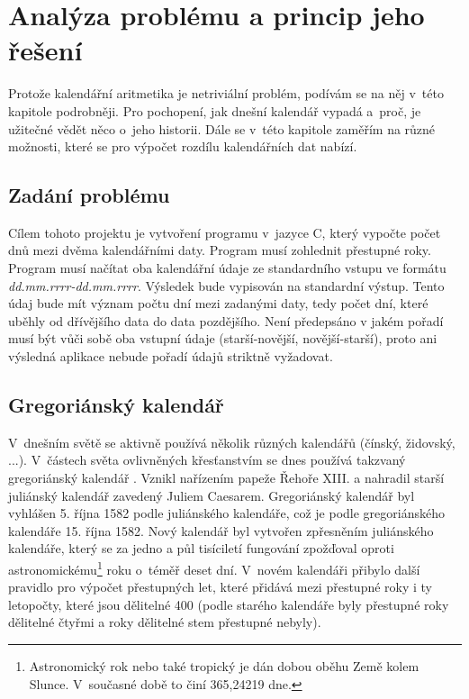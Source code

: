 \documentclass[12pt,a4paper,titlepage,final]{article}
\begin{document}
\section{Analýza problému a princip jeho řešení} \label{analyza}

Protože kalendářní aritmetika je netriviální problém, podívám se na něj v~této
kapitole podrobněji. Pro pochopení, jak dnešní kalendář vypadá a~proč, je
užitečné vědět něco o~jeho historii. Dále se v~této kapitole zaměřím na různé
možnosti, které se pro výpočet rozdílu kalendářních dat nabízí.

\subsection{Zadání problému}

Cílem tohoto projektu je vytvoření programu v~jazyce C, který vypočte počet dnů
mezi dvěma kalendářními daty. Program musí zohlednit přestupné roky. Program
musí načítat oba kalendářní údaje ze standardního vstupu ve formátu
\textit{dd.mm.rrrr-dd.mm.rrrr}. Výsledek bude vypisován na standardní výstup.
Tento údaj bude mít význam počtu dní mezi zadanými daty, tedy počet dní, které
uběhly od dřívějšího data do data pozdějšího. Není předepsáno  v jakém pořadí
musí být vůči sobě oba vstupní údaje (starší-novější, novější-starší), proto
ani výsledná aplikace nebude pořadí údajů striktně vyžadovat.

\subsection{Gregoriánský kalendář}

V~dnešním světě se aktivně používá několik různých kalendářů (čínský, židovský,
...). V~částech světa ovlivněných křesťanstvím se dnes používá takzvaný
gregoriánský kalendář \cite{kalendar}.  Vznikl nařízením papeže Řehoře XIII. a
nahradil starší juliánský kalendář zavedený Juliem Caesarem. Gregoriánský
kalendář byl vyhlášen 5. října 1582 podle juliánského kalendáře, což je podle
gregoriánského kalendáře 15. října 1582. Nový kalendář byl vytvořen zpřesněním
juliánského kalendáře, který se za jedno a půl tisíciletí fungování zpožďoval
oproti astronomickému\footnote{Astronomický rok nebo také tropický je dán dobou
oběhu Země kolem Slunce. V~současné době to činí 365,24219 dne.} roku o~téměř
deset dní. V~novém kalendáři přibylo další pravidlo pro výpočet přestupných
let, které přidává mezi přestupné roky i ty letopočty, které jsou dělitelné 400
(podle starého kalendáře byly přestupné roky dělitelné čtyřmi a roky dělitelné
stem přestupné nebyly).
\end{document}
